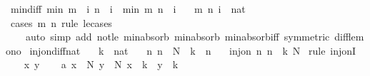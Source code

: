 \begin{isabellebody}
\endisatagproof
{\isafoldproof}%
%
\isadelimproof
\isanewline
%
\endisadelimproof
\isanewline
{}\isamarkupfalse%
\ min{\isacharunderscore}{\kern0pt}diff{\isacharcolon}{\kern0pt}\ {\isachardoublequoteopen}min\ {\isacharparenleft}{\kern0pt}m\ {\isacharminus}{\kern0pt}\ i{\isacharparenright}{\kern0pt}\ {\isacharparenleft}{\kern0pt}n\ {\isacharminus}{\kern0pt}\ i{\isacharparenright}{\kern0pt}\ {\isacharequal}{\kern0pt}\ min\ m\ n\ {\isacharminus}{\kern0pt}\ i{\isachardoublequoteclose}\isanewline
\ \ \ m\ n\ i\ {\isacharcolon}{\kern0pt}{\isacharcolon}{\kern0pt}\ nat\isanewline
%
\isadelimproof
\ \ %
\endisadelimproof
%
\isatagproof
{}\isamarkupfalse%
\ {\isacharparenleft}{\kern0pt}cases\ m\ n\ rule{\isacharcolon}{\kern0pt}\ le{\isacharunderscore}{\kern0pt}cases{\isacharparenright}{\kern0pt}\isanewline
\ \ \ \ {\isacharparenleft}{\kern0pt}auto\ simp\ add{\isacharcolon}{\kern0pt}\ not{\isacharunderscore}{\kern0pt}le\ min{\isachardot}{\kern0pt}absorb{}\ min{\isachardot}{\kern0pt}absorb{}\ min{\isachardot}{\kern0pt}absorb{\isacharunderscore}{\kern0pt}iff{}\ {\isacharbrackleft}{\kern0pt}symmetric{\isacharbrackright}{\kern0pt}\ diff{\isacharunderscore}{\kern0pt}le{\isacharunderscore}{\kern0pt}mono{\isacharparenright}{\kern0pt}%
\endisatagproof
{\isafoldproof}%
%
\isadelimproof
\isanewline
%
\endisadelimproof
\isanewline
{}\isamarkupfalse%
\ inj{\isacharunderscore}{\kern0pt}on{\isacharunderscore}{\kern0pt}diff{\isacharunderscore}{\kern0pt}nat{\isacharcolon}{\kern0pt}\isanewline
\ \ \ k\ {\isacharcolon}{\kern0pt}{\isacharcolon}{\kern0pt}\ nat\isanewline
\ \ \ {\isachardoublequoteopen}{\isasymAnd}n{\isachardot}{\kern0pt}\ n\ {\isasymin}\ N\ {\isasymLongrightarrow}\ k\ {\isasymle}\ n{\isachardoublequoteclose}\isanewline
\ \ \ {\isachardoublequoteopen}inj{\isacharunderscore}{\kern0pt}on\ {\isacharparenleft}{\kern0pt}{\isasymlambda}n{\isachardot}{\kern0pt}\ n\ {\isacharminus}{\kern0pt}\ k{\isacharparenright}{\kern0pt}\ N{\isachardoublequoteclose}\isanewline
%
\isadelimproof
%
\endisadelimproof
%
\isatagproof
{}\isamarkupfalse%
\ {\isacharparenleft}{\kern0pt}rule\ inj{\isacharunderscore}{\kern0pt}onI{\isacharparenright}{\kern0pt}\isanewline
\ \ \isamarkupfalse%
\ x\ y\isanewline
\ \ \isamarkupfalse%
\ a{\isacharcolon}{\kern0pt}\ {\isachardoublequoteopen}x\ {\isasymin}\ N{\isachardoublequoteclose}\ {\isachardoublequoteopen}y\ {\isasymin}\ N{\isachardoublequoteclose}\ {\isachardoublequoteopen}x\ {\isacharminus}{\kern0pt}\ k\ {\isacharequal}{\kern0pt}\ y\ {\isacharminus}{\kern0pt}\ k{\isachardoublequoteclose}\isanewline

\end{isabellebody}
